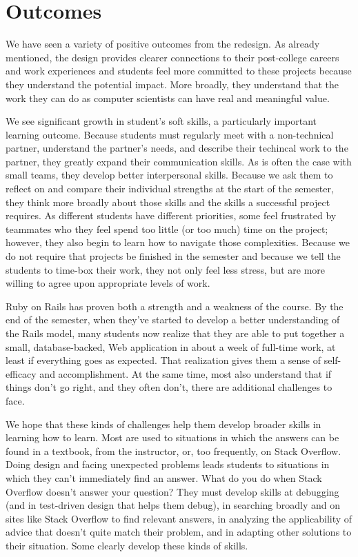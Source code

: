 \section{Outcomes}

We have seen a variety of positive outcomes from the redesign.  As
already mentioned, the design provides clearer connections to their
post-college careers and work experiences and students feel more
committed to these projects because they understand the potential
impact.  More broadly, they understand that the work they can do
as computer scientists can have real and meaningful value.

We see significant growth in student's soft skills, a particularly
important learning outcome.
Because students must regularly meet with a
non-technical partner, understand the partner's needs, and
describe their techincal work to the partner,
they greatly expand their communication skills.
As is often the case with small teams, they develop better interpersonal
skills.  Because we ask them to reflect on and compare their individual
strengths at the start of the semester,
they think more broadly
about those skills and the skills a successful
project requires.  As different students have different priorities,
some feel frustrated by teammates who they feel spend
too little (or too much) time on the project; however, they also
begin to learn how to navigate those complexities.  Because we do
not require that projects be finished in the semester and because
we tell the students to time-box their work, they not only feel
less stress, but are more willing to agree upon appropriate levels
of work. 

Ruby on Rails has proven both a strength and a weakness
of the course.  By the end of the semester, when they've started to develop
a better understanding of the Rails model, many students now realize that they 
are able to put together a small, database-backed, Web application
in about a week of full-time work, at least if everything goes as
expected.  
That realization gives them a sense of self-efficacy
and accomplishment.  At the same time, most also understand that if things
don't go right, and they often don't, there are additional challenges
to face.

We hope that these kinds of challenges help them develop broader
skills in learning how to learn.  Most are used to situations in
which the answers can be found in a textbook, from the instructor,
or, too frequently, on Stack Overflow.  Doing design and facing 
unexpected problems leads students to situations in
which they can't immediately find an answer.  What do you do when
Stack Overflow doesn't answer your question?  They must develop skills
at debugging (and in test-driven design that helps them
debug), in searching broadly and on sites like Stack Overflow
to find relevant answers, in analyzing the applicability of advice
that doesn't quite match their problem, and in adapting other
solutions to their situation.  Some clearly develop these kinds
of skills.  

